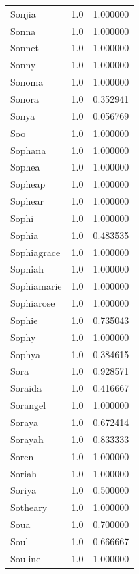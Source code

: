 \documentclass[
  letterpaper,
  DIV=11,
  numbers=noendperiod]{scrreprt}
\begin{document}
\begin{tabular}{lrr}
Sonjia          &   1.0 &   1.000000 \\
Sonna           &   1.0 &   1.000000 \\
Sonnet          &   1.0 &   1.000000 \\
Sonny           &   1.0 &   1.000000 \\
Sonoma          &   1.0 &   1.000000 \\
Sonora          &   1.0 &   0.352941 \\
Sonya           &   1.0 &   0.056769 \\
Soo             &   1.0 &   1.000000 \\
Sophana         &   1.0 &   1.000000 \\
Sophea          &   1.0 &   1.000000 \\
Sopheap         &   1.0 &   1.000000 \\
Sophear         &   1.0 &   1.000000 \\
Sophi           &   1.0 &   1.000000 \\
Sophia          &   1.0 &   0.483535 \\
Sophiagrace     &   1.0 &   1.000000 \\
Sophiah         &   1.0 &   1.000000 \\
Sophiamarie     &   1.0 &   1.000000 \\
Sophiarose      &   1.0 &   1.000000 \\
Sophie          &   1.0 &   0.735043 \\
Sophy           &   1.0 &   1.000000 \\
Sophya          &   1.0 &   0.384615 \\
Sora            &   1.0 &   0.928571 \\
Soraida         &   1.0 &   0.416667 \\
Sorangel        &   1.0 &   1.000000 \\
Soraya          &   1.0 &   0.672414 \\
Sorayah         &   1.0 &   0.833333 \\
Soren           &   1.0 &   1.000000 \\
Soriah          &   1.0 &   1.000000 \\
Soriya          &   1.0 &   0.500000 \\
Sotheary        &   1.0 &   1.000000 \\
Soua            &   1.0 &   0.700000 \\
Soul            &   1.0 &   0.666667 \\
Souline         &   1.0 &   1.000000 \\

\end{tabular}
\end{document}
